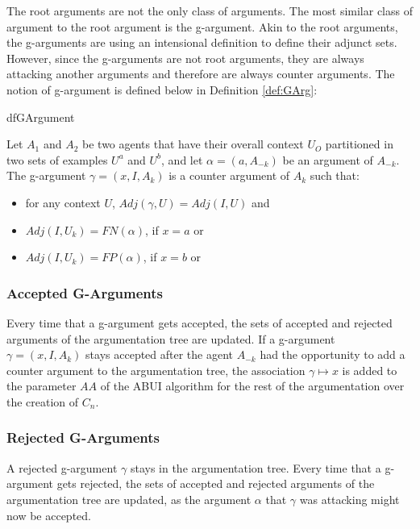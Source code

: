 The root arguments are not the only class of arguments. The most similar class of argument to the root argument is the g-argument. Akin to the root arguments, the g-arguments are using an intensional definition to define their adjunct sets. However, since the g-arguments are not root arguments, they are always attacking another arguments and therefore are always counter arguments. The notion of g-argument is defined below in Definition \ref{def:GArg}:

\begin{restatable}[G-Argument]{df}{GArgument}
\label{def:GArg}

Let $A_{1}$ and $A_{2}$ be two agents that have their overall context $U_{O}$ partitioned in two sets of examples $U^{a}$ and $U^{b}$, and let $\alpha = (a,A_{-k})$ be an argument of $A_{-k}$. The g-argument $\gamma = (x,I,A_{k})$ is a counter argument of $A_{k}$ such that: 

\begin{itemize}
    \item for any context $U$, $Adj(\gamma,U) = Adj(I,U)$ and
    \item $Adj(I,U_{k}) = FN(\alpha)$, if $x = a$ or
    \item $Adj(I,U_{k}) = FP(\alpha)$, if $x = b$ or
\end{itemize}

\end{restatable}

\subsubsection{Accepted G-Arguments}

Every time that a g-argument gets accepted, the sets of accepted and rejected arguments of the argumentation tree are updated. If a g-argument $\gamma = (x,I,A_{k})$ stays accepted after the agent $A_{-k}$ had the opportunity to add a counter argument to the argumentation tree, the association $\gamma \mapsto x$ is added to the parameter $AA$ of the ABUI algorithm for the rest of the argumentation over the creation of $C_{n}$. 

\subsubsection{Rejected G-Arguments}

A rejected g-argument $\gamma$ stays in the argumentation tree. Every time that a g-argument gets rejected, the sets of accepted and rejected arguments of the argumentation tree are updated, as the argument $\alpha$ that $\gamma$ was attacking might now be accepted.

